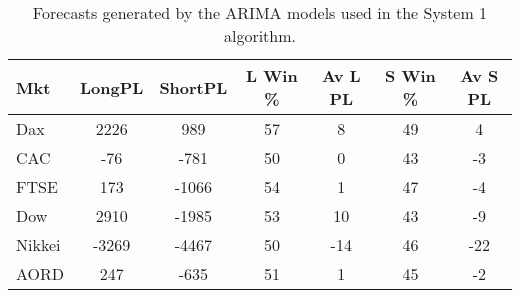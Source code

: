 \begin{table}[ht]
\centering
\caption[Forecasts generated by the ARIMA models used in the System 1 algorithm]{Forecasts generated by the ARIMA models used in the System 1 algorithm.} 
\label{tab:chp_ts:arima2}
\begin{tabular}{lcccccc}
  \toprule Mkt & LongPL & ShortPL & L Win \% & Av L PL & S Win \% & Av S PL \\ 
  \midrule Dax & 2226 & 989 & 57 & 8 & 49 & 4 \\ 
  CAC & -76 & -781 & 50 & 0 & 43 & -3 \\ 
  FTSE & 173 & -1066 & 54 & 1 & 47 & -4 \\ 
  Dow & 2910 & -1985 & 53 & 10 & 43 & -9 \\ 
  Nikkei & -3269 & -4467 & 50 & -14 & 46 & -22 \\ 
  AORD & 247 & -635 & 51 & 1 & 45 & -2 \\ 
   \bottomrule \end{tabular}
\end{table}
